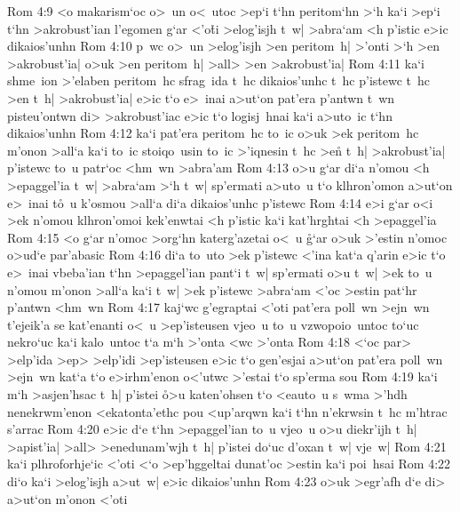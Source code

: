 \vs Rom 4:9
<o
makarism`oc
o>~un
o<~utoc
>ep`i
t`hn
peritom`hn
>`h
ka`i
>ep`i
t`hn
>akrobust'ian
l'egomen
g`ar
<'o\r{t}i
>elog'isjh
t~w|
>abra`am
<h
p'istic
e>ic
dikaios'unhn\bibvsend
\vs Rom 4:10
p~wc
o>~un
>elog'isjh
>en
peritom~h|
>'onti
>`h
>en
>akrobust'ia|
o>uk
>en
peritom~h|
>all>
>en
>akrobust'ia|\bibvsend
\vs Rom 4:11
ka`i
shme~ion
>'elaben
peritom~hc
sfrag~ida
t~hc
dikaios'unhc
t~hc
p'istewc
t~hc
>en
t~h|
>akrobust'ia|
e>ic
t`o
e>~inai
a>ut`on
pat'era
p'antwn
t~wn
pisteu'ontwn
di>
>akrobust'iac
e>ic
t`o
logisj~hnai
ka`i
a>uto~ic
t`hn
dikaios'unhn\bibvsend
\vs Rom 4:12
ka`i
pat'era
peritom~hc
to~ic
o>uk
>ek
peritom~hc
m'onon
>all`a
ka`i
to~ic
stoiqo~usin
to~ic
>'iqnesin
t~hc
>en\r{}
t~h|
>akrobust'ia|
p'istewc
to~u
patr`oc
<hm~wn
>abra'am\bibvsend
\vs Rom 4:13
o>u
g`ar
di`a
n'omou
<h
>epaggel'ia
t~w|
>abra`am
>`h
t~w|
sp'ermati
a>uto~u
t`o
klhron'omon
a>ut`on
e>~inai
t\r{o}~u
k'osmou
>all`a
di`a
dikaios'unhc
p'istewc\bibvsend
\vs Rom 4:14
e>i
g`ar
o<i
>ek
n'omou
klhron'omoi
kek'enwtai
<h
p'istic
ka`i
kat'hrghtai
<h
>epaggel'ia\bibvsend
\vs Rom 4:15
<o
g`ar
n'omoc
>org`hn
katerg'azetai
o<~u
\r{g}`ar
o>uk
>'estin
n'omoc
o>ud`e
par'abasic\bibvsend
\vs Rom 4:16
di`a
to~uto
>ek
p'istewc
<'ina
kat`a
q'arin
e>ic
t`o
e>~inai
vbeba'ian
t`hn
>epaggel'ian
pant`i
t~w|
sp'ermati
o>u
t~w|
>ek
to~u
n'omou
m'onon
>all`a
ka`i
t~w|
>ek
p'istewc
>abra`am
<'oc
>estin
pat`hr
p'antwn
<hm~wn\bibvsend
\vs Rom 4:17
kaj`wc
g'egraptai
<'oti
pat'era
poll~wn
>ejn~wn
t'ejeik'a
se
kat'enanti
o<~u
>ep'isteusen
vjeo~u
to~u
vzwopoio~untoc
to`uc
nekro`uc
ka`i
kalo~untoc
t`a
m`h
>'onta
<wc
>'onta\bibvsend
\vs Rom 4:18
<`oc
par>
>elp'ida
>ep>
>elp'idi
>ep'isteusen
e>ic
t`o
gen'esjai
a>ut`on
pat'era
poll~wn
>ejn~wn
kat`a
t`o
e>irhm'enon
o<'utwc
>'estai
t`o
sp'erma
sou\bibvsend
\vs Rom 4:19
ka`i
m`h
>asjen'hsac
t~h|
p'istei
\r{o}>u
katen'ohsen
t`o
<eauto~u
s~wma
>'hdh
nenekrwm'enon
<ekatonta'ethc
pou
<up'arqwn
ka`i
t`hn
n'ekrwsin
t~hc
m'htrac
s'arrac\bibvsend
\vs Rom 4:20
e>ic
d`e
t`hn
>epaggel'ian
to~u
vjeo~u
o>u
diekr'ijh
t~h|
>apist'ia|
>all>
>enedunam'wjh
t~h|
p'istei
do`uc
d'oxan
t~w|
vje~w|\bibvsend
\vs Rom 4:21
ka`i
plhroforhje`ic
<'oti
<`o
>ep'hggeltai
dunat'oc
>estin
ka`i
poi~hsai\bibvsend
\vs Rom 4:22
di`o
ka`i
>elog'isjh
a>ut~w|
e>ic
dikaios'unhn\bibvsend
\vs Rom 4:23
o>uk
>egr'afh
d`e
di>
a>ut`on
m'onon
<'oti
